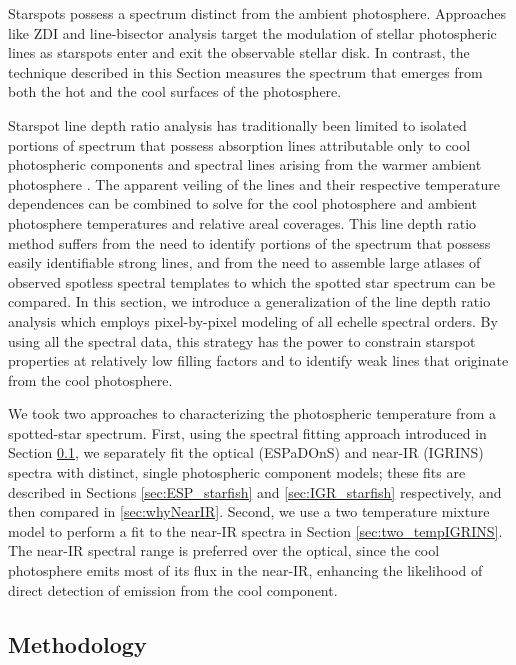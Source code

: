 \documentclass[twocolumn]{emulateapj}%
\begin{document}
Starspots possess a spectrum distinct from the ambient photosphere.  Approaches like ZDI and line-bisector analysis \citep[\emph{e.g.}][]{prato08, donati14} target the modulation of stellar photospheric lines as starspots enter and exit the observable stellar disk.  In contrast, the technique described in this Section measures the spectrum that emerges from both the hot and the cool surfaces of the photosphere.

Starspot line depth ratio analysis has traditionally been limited to isolated portions of spectrum that possess absorption lines attributable only to cool photospheric components and spectral lines arising from the warmer ambient photosphere \citep[\emph{e.g.}][]{neff95, oneal01}.  The apparent veiling of the lines and their respective temperature dependences can be combined to solve for the cool photosphere and ambient photosphere temperatures and relative areal coverages.  This line depth ratio method suffers from the need to identify portions of the spectrum that possess easily identifiable strong lines, and from the need to assemble large atlases of observed spotless spectral templates to which the spotted star spectrum can be compared.  In this section, we introduce a generalization of the line depth ratio analysis which employs pixel-by-pixel modeling of all echelle spectral orders.  By using all the spectral data, this strategy has the power to constrain starspot properties at relatively low filling factors and to identify weak lines that originate from the cool photosphere.

We took two approaches to characterizing the photospheric temperature from a spotted-star spectrum.  First, 
using the spectral fitting approach introduced in Section \ref{sec:methods}, we separately fit the optical (ESPaDOnS) and near-IR (IGRINS) spectra with distinct, single photospheric component models; these fits are described in Sections \ref{sec:ESP_starfish} and \ref{sec:IGR_starfish} respectively, and then compared in \ref{sec:whyNearIR}.
Second, we use a two temperature mixture model to perform a fit to the near-IR spectra in Section \ref{sec:two_tempIGRINS}.  The near-IR spectral range is preferred over the optical, since the cool photosphere emits most of its flux in the near-IR, enhancing the likelihood of direct detection of emission from the cool component.  


\subsection{Methodology}\label{sec:methods} 
\end{document}
